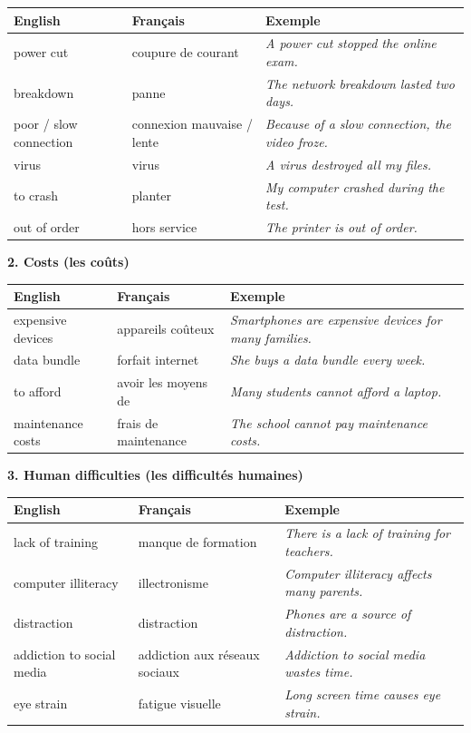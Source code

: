\documentclass[11pt]{article}
\newcommand{\eng}[1]{\ifmmode\text{\textit{#1}}\else\begingroup\selectlanguage{english}\itshape #1\endgroup\fi}
\begin{document}
\begin{center}
\begin{tabularx}{\linewidth}{|X|X|X|}\hline
\rowcolor{popblueL} \textbf{English} & \textbf{Français} & \textbf{Exemple} \\ \hline
power cut & coupure de courant & \eng{A power cut stopped the online exam.} \\ \hline
breakdown & panne & \eng{The network breakdown lasted two days.} \\ \hline
poor / slow connection & connexion mauvaise / lente & \eng{Because of a slow connection, the video froze.} \\ \hline
virus & virus & \eng{A virus destroyed all my files.} \\ \hline
to crash & planter & \eng{My computer crashed during the test.} \\ \hline
out of order & hors service & \eng{The printer is out of order.} \\ \hline
\end{tabularx}
\end{center}

\textbf{2. Costs (les coûts)}

\begin{center}
\begin{tabularx}{\linewidth}{|X|X|X|}\hline
\rowcolor{popblueL} \textbf{English} & \textbf{Français} & \textbf{Exemple} \\ \hline
expensive devices & appareils coûteux & \eng{Smartphones are expensive devices for many families.} \\ \hline
data bundle & forfait internet & \eng{She buys a data bundle every week.} \\ \hline
to afford & avoir les moyens de & \eng{Many students cannot afford a laptop.} \\ \hline
maintenance costs & frais de maintenance & \eng{The school cannot pay maintenance costs.} \\ \hline
\end{tabularx}
\end{center}

\textbf{3. Human difficulties (les difficultés humaines)}

\begin{center}
\begin{tabularx}{\linewidth}{|X|X|X|}\hline
\rowcolor{popblueL} \textbf{English} & \textbf{Français} & \textbf{Exemple} \\ \hline
lack of training & manque de formation & \eng{There is a lack of training for teachers.} \\ \hline
computer illiteracy & illectronisme & \eng{Computer illiteracy affects many parents.} \\ \hline
distraction & distraction & \eng{Phones are a source of distraction.} \\ \hline
addiction to social media & addiction aux réseaux sociaux & \eng{Addiction to social media wastes time.} \\ \hline
eye strain & fatigue visuelle & \eng{Long screen time causes eye strain.} \\ \hline
\end{tabularx}
\end{center}
\end{document}
